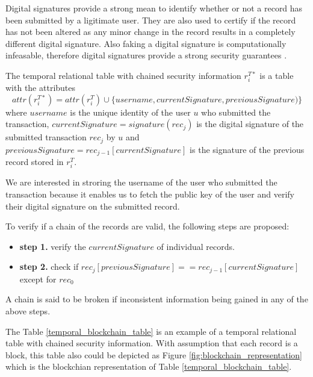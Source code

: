 			Digital signatures provide a strong mean to identify whether or not a record has been submitted by a ligitimate user. They are also used to certify if the record has not been altered as any minor change in the record results in a completely different digital signature. Also faking a digital signature is computationally infeasable, therefore digital signatures provide a strong security guarantees \cite{katz2010digital}.

			\begin{defn}
				The temporal relational table with chained security information $r_i^{T*}$ is a table with the attributes $$attr(r_i^{T*}) = attr(r_i^T) \cup \{username,currentSignature, previousSignature)\}$$ where $username$ is the unique identity of the user $u$ who submitted the transaction, $currentSignature = signature(rec_j)$ is the digital signature of the submitted transaction $rec_j$ by $u$ and $previousSignature = rec_{j-1}[currentSignature]$ is the signature of the previous record stored in $r_i^T$. 
			\label{defn:temporal_blockchain}
			\end{defn}

			We are interested in stroring the username of the user who submitted the transaction because it enables us to fetch the public key of the user and verify their digital signature on the submitted record. 

			\begin{defn}
				To verify if a chain of the records are valid, the following steps are proposed:
				\begin{itemize}
					\item \textbf{step 1.} verify the $currentSignature$ of individual records.
					\item \textbf{step 2.} check if $rec_j[previousSignature] == rec_{j-1}[currentSignature]$ except for $rec_0$
				\end{itemize}
			\label{chain_verification}
			\end{defn}
			A chain is said to be broken if inconsistent information being gained in any of the above steps.

			\begin{example} 
				The Table \ref{temporal_blockchain_table} is an example of a temporal relational table with chained security information. With assumption that each record is a block, this table also could be depicted as Figure \ref{fig:blockchain_representation} which is the blockchian representation of Table \ref{temporal_blockchain_table}.
			\label{example:blockchain}
			\end{example}

